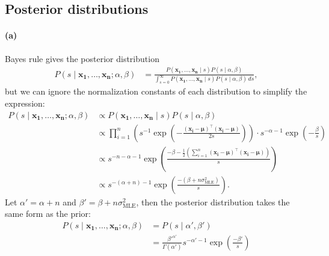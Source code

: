 \documentclass[a4paper,11pt]{article}
\DeclareMathOperator{\given}{\mid}
\begin{document}
\subsection{Posterior distributions}

\paragraph{(a)} Bayes rule gives the posterior distribution
\begin{align*}
  P(s\given \mathbf{x_1},\dots,\mathbf{x_n};\alpha,\beta)
    &=\frac{
        P(\mathbf{x_1},\dots,\mathbf{x_n}\given s)P(s\given\alpha,\beta)
      }{
        \int_{s=0}^\infty P(\mathbf{x_1},\dots,\mathbf{x_n}\given s)P(s\given\alpha,\beta)\,ds
      },
\end{align*}
but we can ignore the normalization constants of each distribution to simplify the expression:
\begin{align*}
  P(s\given \mathbf{x_1},\dots,\mathbf{x_n};\alpha,\beta)
    &\propto P(\mathbf{x_1},\dots,\mathbf{x_n}\given s)P(s\given\alpha,\beta)\\
    &\propto
      \prod_{i=1}^n \left(
        s^{-1}\exp\left(-\frac{(\mathbf{x_i}-\boldsymbol\mu)^\top(\mathbf{x_i}-\boldsymbol\mu)}{2s}\right)
      \right)
      \cdot
      s^{-\alpha-1}\exp\left(-\frac{\beta}{s}\right)\\
    &\propto
      s^{-n-\alpha-1}
      \exp\left(
        \frac{
          -\beta
          -\frac{1}{2}\left(
            \sum_{i=1}^n
              (\mathbf{x_i}-\boldsymbol\mu)^\top(\mathbf{x_i}-\boldsymbol\mu)
          \right)
        }{
          s
        }
      \right)\\
    &\propto
      s^{-(\alpha+n)-1}
      \exp\left(
        \frac{
          -(\beta+n\sigma_\mathrm{\scriptscriptstyle{MLE}}^2)
        }{
          s
        }
      \right).
\end{align*}
Let $\alpha'=\alpha+n$ and $\beta'=\beta+n\sigma_\mathrm{\scriptscriptstyle{MLE}}^2$, then the posterior distribution takes the same form as the prior:
\begin{align*}
P(s\given \mathbf{x_1},\dots,\mathbf{x_n};\alpha,\beta)
  &=P(s\given\alpha',\beta')\\
  &=\frac{{\beta'}^{\alpha'}}{\Gamma(\alpha')}s^{-\alpha'-1}\exp\left(\frac{-\beta'}{s}\right)
\end{align*}
\end{document}
